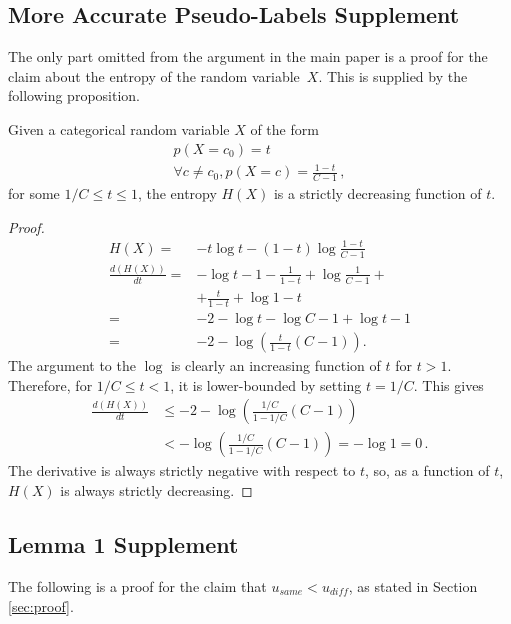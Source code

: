 \documentclass[runningheads]{llncs}
\begin{document}
\subsection{More Accurate Pseudo-Labels Supplement}
The only part omitted from the argument in the main paper is a proof for the claim about the entropy of the random variable~$X$. This is supplied by the following proposition.
\begin{proposition}
Given a categorical random variable $X$ of the form 
\begin{gather*}
    p(X=c_0) = t \\
    \forall c \neq c_0, p(X=c) = \frac{1-t}{C-1}\,,
\end{gather*}
for some $1/C \leq t \leq 1$, the entropy $H(X)$ is a strictly decreasing function of $t$. 
\end{proposition}
\begin{proof}
\begin{align*}
    H(X) =& - t\log t - (1-t)\log \frac{1-t}{C-1} \\
    \frac{d(H(X))}{dt} =& - \log t - 1 - \frac{1}{1-t} + \log \frac{1}{C-1} + \\
    & + \frac{t}{1-t} + \log 1-t \\
    =& -2 - \log t - \log C-1 + \log t-1 \\
    =& -2 - \log \left(\frac{t}{1-t}(C-1)\right).
\end{align*}
The argument to the $\log$ is clearly an increasing function of $t$ for $t>1$. Therefore, for $1/C \leq t < 1$, it is lower-bounded by setting $t = 1/C$. This gives
\begin{align*}
    \frac{d(H(X))}{dt} &\leq -2 - \log \left(\frac{1/C}{1-1/C}(C-1)\right) \\
    &< -\log \left(\frac{1/C}{1-1/C}(C-1)\right) = -\log 1 = 0\,.
\end{align*}
The derivative is always strictly negative with respect to $t$, so, as a function of $t$, $H(X)$ is always strictly decreasing.
\end{proof}

\subsection{Lemma 1 Supplement}
The following is a proof for the claim that $u_{\mathit{same}} < u_{\mathit{diff}}$, as stated in Section \ref{sec:proof}.
\end{document}
